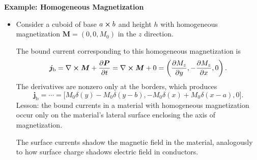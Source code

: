 \documentclass[11pt, a4paper]{article}
\renewcommand{\vec}[1]{\bm{#1}} %
\renewcommand{\P}{\vec{P}}  %
\newcommand{\M}{\vec{M}}  %
\renewcommand{\j}{\vec{j}}  %
\renewcommand{\curl}{\nabla \cross}
\begin{document}
\textbf{Example: Homogeneous Magnetization}
\begin{itemize}
	\item Consider a cuboid of base $ a \cross b $ and height $ h $ with homogeneous magnetization $ \M = (0, 0, M_{0}) $ in the $ z $ direction. 

    The bound current corresponding to this homogeneous magnetization is
	\begin{equation*}
		\j_{\text{b}} = \curl \M + \pdv{\P}{t} = \curl \M + 0 = \left(\pdv{M_{z}}{y}, - \pdv{M_{z}}{x}, 0\right).
	\end{equation*}
	The derivatives are nonzero only at the borders, which produces
	\begin{equation*}
		\j_{\text{b}} = \cdots = \big[M_{0}\delta(y) - M_{0}\delta(y-b), -M_{0}\delta(x) + M_{0}\delta(x - a), 0\big].
	\end{equation*}
	Lesson: the bound currents in a material with homogeneous magnetization occur only on the material's lateral surface enclosing the axis of magnetization. 
	
	The surface currents shadow the magnetic field in the material, analogously to how surface charge shadows electric field in conductors.
\end{itemize}
\end{document}
